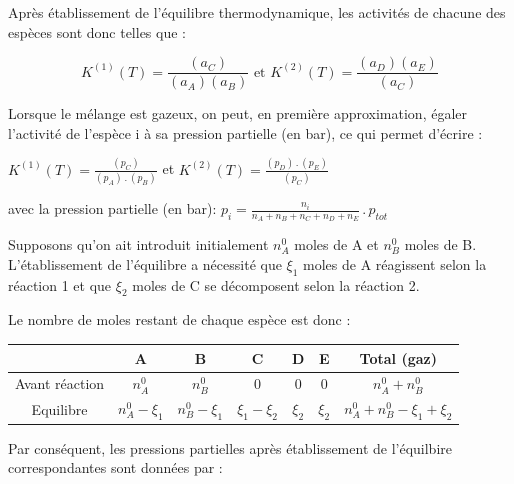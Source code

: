 \documentclass[fr]{../../../eplsummary}
\begin{document}
\par Après établissement de l’équilibre thermodynamique, les activités de chacune des espèces sont donc telles que :

$$K^{(1)}(T) = \frac{(a_{C})}{(a_{A})  (a_{B})} \mbox{ et } K^{(2)}(T) = \frac{(a_{D}) (a_{E})}{(a_{C})}$$


\par Lorsque le mélange est gazeux, on peut, en première approximation, égaler l’activité de l’espèce i à sa pression
partielle (en bar), ce qui permet d’écrire :\\

\begin{center}
$K^{(1)}(T) = \frac{(p_{C})}{(p_{A}) \, . \, (p_{B})}$ et $K^{(2)}(T) = \frac{(p_{D}) \, . \, (p_{E})}{(p_{C})}$ 
\end{center}

\par avec la pression partielle (en bar): $p_{i} = \frac{n_{i}}{n_{A} + n_{B} + n_{C} +n_{D} + n_{E}} \, . \, p_{tot}$\\

\par Supposons qu’on ait introduit initialement $n^{0}_{A}$ moles de A et $n^{0}_{B}$ moles de B. L’établissement de l’équilibre a nécessité que $\xi_{1}$ moles de A réagissent selon la réaction 1 et que $\xi_{2}$ moles de C se décomposent selon la réaction 2.\\ 
\par Le nombre de moles restant de chaque espèce est donc :\\
\begin{center}
\begin{tabular}{c|c|c|c|c|c|c}
     & A & B & C & D & E & Total (gaz)  \\
     \hline
     Avant réaction & $n^{0}_{A}$ & $n^{0}_{B}$ & 0 & 0 & 0 & $n^{0}_{A} + n^{0}_{B}$ \\
    \hline
    Equilibre & $n^{0}_{A} - \xi_{1}$ & $n^{0}_{B} - \xi_{1}$ & $\xi_{1} - \xi_{2}$ & $\xi_{2}$ & $\xi_{2}$ & $n^{0}_{A} + n^{0}_{B} - \xi_{1} + \xi_{2}$ \\ 
\end{tabular}
\end{center}

\par Par conséquent, les pressions partielles après établissement de l'équilbire correspondantes sont données par :
\end{document}
